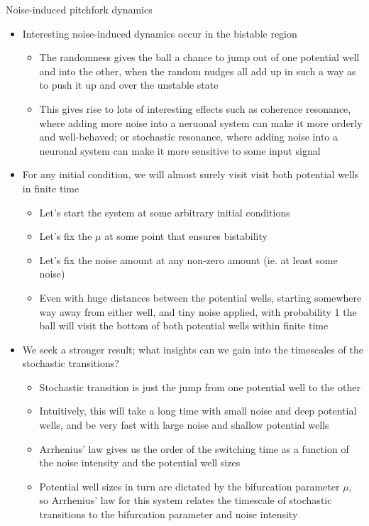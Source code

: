 \documentclass[presentation]{beamer}
\begin{document}
\begin{frame}[label={sec:org8354da9},plain]{Noise-induced pitchfork dynamics}
\begin{itemize}
\item Interesting noise-induced dynamics occur in the bistable region
\begin{itemize}
\item The randomness gives the ball a chance to jump out of one potential well and into the other, when the random nudges all add up in such a way as to push it up and over the unstable state
\item This gives rise to lots of interesting effects such as coherence resonance, where adding more noise into a neruonal system can make it more orderly and well-behaved; or stochastic resonance, where adding noise into a neuronal system can make it more sensitive to some input signal
\end{itemize}
\end{itemize}

\vfill
\begin{itemize}
\item For any initial condition, we will almost surely visit visit both potential wells in finite time
\begin{itemize}
\item Let's start the system at some arbitrary initial conditions
\item Let's fix the \(\mu\) at some point that ensures bistability
\item Let's fix the noise amount at any non-zero amount (ie. at least some noise)
\item Even with huge distances between the potential wells, starting somewhere way away from either well, and tiny noise applied, with probability 1 the ball will visit the bottom of both potential wells within finite time
\end{itemize}
\end{itemize}

\vfill
\begin{itemize}
\item We seek a stronger result; what insights can we gain into the timescales of the stochastic transitions?
\begin{itemize}
\item Stochastic transition is just the jump from one potential well to the other
\item Intuitively, this will take a long time with small noise and deep potential wells, and be very fast with large noise and shallow potential wells
\item Arrhenius' law gives us the order of the switching time as a function of the noise intensity and the potential well sizes
\item Potential well sizes in turn are dictated by the bifurcation parameter \(\mu\), so Arrhenius' law for this system relates the timescale of stochastic transitions to the bifurcation parameter and noise intensity
\end{itemize}
\end{itemize}
\end{frame}
\end{document}
